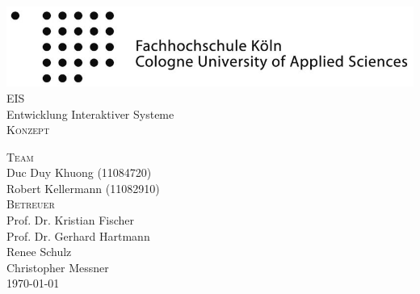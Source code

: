 
\begin{titlepage}

\begin{center}

\includegraphics[width=1.0\textwidth]{fhkoeln.jpg}
\\[2cm]
\textsc{\LARGE EIS}
\\[0.2cm]
{\Large Entwicklung Interaktiver Systeme}
\\[3cm]
\textsc{\Huge Konzept}

\vfill

\textsc{\Large Team}\\
Duc Duy Khuong (11084720)\\
Robert Kellermann (11082910)
\\[1cm]
\textsc{\Large Betreuer}\\
Prof. Dr. Kristian Fischer\\
Prof. Dr. Gerhard Hartmann\\
Renee Schulz\\
Christopher Messner
\\[2cm]
\today

\end{center}

\end{titlepage}